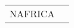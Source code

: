 \documentclass[journal abbreviation, manuscript]{copernicus}
\begin{document}
\begin{table}
\begin{tabularx}{\textwidth}{lX}
       NAFRICA &                                                                                                                                                                                                                                                                                                                                                                                                                                                                                                                                                                                                                                                                                                                                                                                                                                                                                                                                                                                                                                                                                                                                                                                                                                                                                                                                                                                                                                                                                                                                                                                                                                                                                                                                                                                                                                                                                                                                                                                                                                                                                                                                                                                                                                                                                                                                                                                                                                                                                                                                                                                                                                                                                                                                                                                                                                                                                                                                                                                                                                                                                                                                                                                                                                                                                                                                                                                                         
\end{tabularx}
\end{table}
\end{document}
